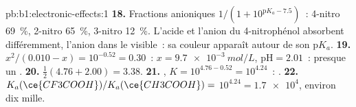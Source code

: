 \begin{solution}{pb:b1:electronic-effects:1}
\textbf{18.} Fractions anioniques $1/(1 + 10^{\mathrm{p}K_a - 7.5})$~:
4-nitro
\qty{69}{\percent}, 2-nitro \qty{65}{\percent}, 3-nitro
\qty{12}{\percent}. L'acide et l'anion du 4-nitrophénol absorbent
différemment, l'anion dans le visible~: sa couleur apparaît autour de son
$\mathrm{p}K_a$.
\textbf{19.} $x^2/(0.010 - x) = 10^{-0.52} = 0.30$~: $x = \qty{9.7e-3}{mol/L}$,
$\mathrm{pH} = 2.01$~: presque un .
\textbf{20.} $\frac12(4.76 + 2.00) = 3.38$.
\textbf{21.} , $K = 10^{4.76 -
0.52} = 10^{4.24}$~: .
\textbf{22.} $K_a(\ce{CF3COOH})/K_a(\ce{CH3COOH}) =$ \textbf{$10^{4.24} =
\num{1.7e4}$}, environ dix mille.
\end{solution}
